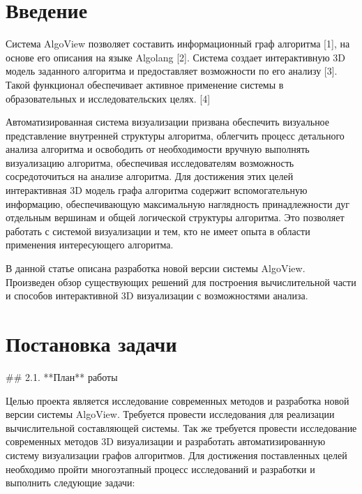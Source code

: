 


\section{Введение} 

Система AlgoView позволяет составить информационный граф алгоритма [1], на основе его описания на языке Algolang [2]. Система создает интерактивную 3D модель заданного алгоритма и предоставляет возможности по его анализу [3]. Такой функционал обеспечивает активное применение системы в образовательных и исследовательских целях. [4]

Автоматизированная система визуализации призвана обеспечить визуальное представление внутренней структуры алгоритма, облегчить процесс детального анализа алгоритма и освободить от необходимости вручную выполнять визуализацию алгоритма, обеспечивая исследователям возможность сосредоточиться на анализе алгоритма. Для достижения этих целей интерактивная 3D модель графа алгоритма содержит вспомогательную информацию, обеспечивающую максимальную наглядность принадлежности дуг отдельным вершинам и общей логической структуры алгоритма. Это позволяет работать с системой визуализации и тем, кто не имеет опыта в области применения интересующего алгоритма. 

В данной статье описана разработка новой версии системы AlgoView. Произведен обзор существующих решений для построения вычислительной части и способов интерактивной 3D визуализации с возможностями анализа.

\section{Постановка задачи}

## 2.1. **План** работы

Целью проекта является исследование современных методов и разработка новой версии системы AlgoView. Требуется провести исследования для реализации вычислительной составляющей системы. Так же требуется провести исследование современных методов 3D визуализации и разработать автоматизированную систему визуализации графов алгоритмов. Для достижения поставленных целей необходимо пройти многоэтапный процесс исследований и разработки и выполнить следующие задачи:

